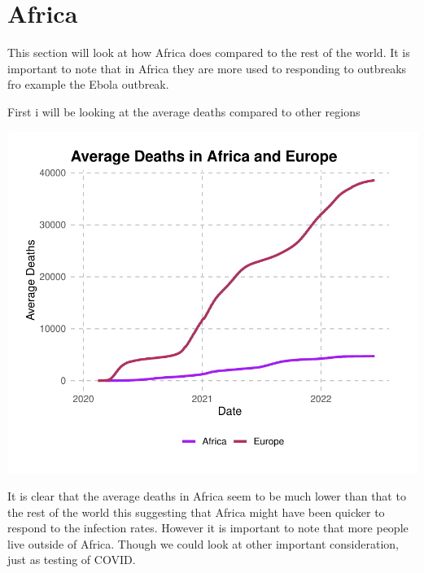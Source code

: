 \documentclass[12pt,preprint, authoryear]{elsarticle}
\let\origfigure\figure
\let\endorigfigure\endfigure
\renewenvironment{figure}[1][2] {
    \expandafter\origfigure\expandafter[H]
} {
    \endorigfigure
}
\numberwithin{equation}{section}
\numberwithin{figure}{section}
\numberwithin{table}{section}
\begin{document}
\hypertarget{africa}{%
\section{Africa}\label{africa}}

This section will look at how Africa does compared to the rest of the
world. It is important to note that in Africa they are more used to
responding to outbreaks fro example the Ebola outbreak.

First i will be looking at the average deaths compared to other regions

\begin{figure}[H]

{\centering \includegraphics{Q1_files/figure-latex/Figure1-1} 

}

\caption{Average deaths \label{Figure1}}\label{fig:Figure1}
\end{figure}

It is clear that the average deaths in Africa seem to be much lower than
that to the rest of the world this suggesting that Africa might have
been quicker to respond to the infection rates. However it is important
to note that more people live outside of Africa. Though we could look at
other important consideration, just as testing of COVID.
\end{document}
